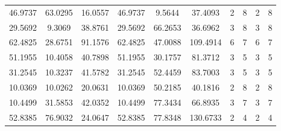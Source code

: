 \documentclass[withoutpreface,bwprint]{cumcmthesis}
\begin{document}
\begin{appendices}
\begin{table}[htbp!]
\begin{tabular}{@{}cccccccccc@{}}
				46.9737                          & 63.0295                          & 16.0557                          & 46.9737                          & 9.5644                           & 37.4093                          & 2                    & 8                    & 2                      & 8                      \\
				29.5692                          & 9.3069                           & 38.8761                          & 29.5692                          & 66.2653                          & 36.6962                          & 3                    & 8                    & 3                      & 8                      \\
				62.4825                          & 28.6751                          & 91.1576                          & 62.4825                          & 47.0088                          & 109.4914                         & 6                    & 7                    & 6                      & 7                      \\
				51.1955                          & 10.4058                          & 40.7898                          & 51.1955                          & 30.1757                          & 81.3712                          & 3                    & 5                    & 3                      & 5                      \\
				31.2545                          & 10.3237                          & 41.5782                          & 31.2545                          & 52.4459                          & 83.7003                          & 3                    & 5                    & 3                      & 5                      \\
				10.0369                          & 10.0262                          & 20.0631                          & 10.0369                          & 50.2185                          & 40.1816                          & 2                    & 8                    & 2                      & 8                      \\
				10.4499                          & 31.5853                          & 42.0352                          & 10.4499                          & 77.3434                          & 66.8935                          & 3                    & 7                    & 3                      & 7                      \\
				52.8385                          & 76.9032                          & 24.0647                          & 52.8385                          & 77.8348                          & 130.6733                         & 2                    & 4                    & 2                      & 4                      \\

\end{tabular}
\end{table}
\end{appendices}
\end{document}
